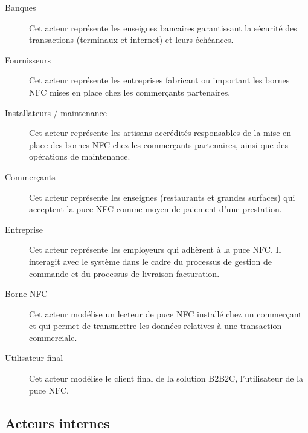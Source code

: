 \begin{description}
    \item[Banques] Cet acteur représente les enseignes bancaires garantissant
        la sécurité des transactions (terminaux et internet) et leurs
        échéances.
    \item[Fournisseurs] Cet acteur représente les entreprises fabricant ou
        important les bornes NFC mises en place chez les commerçants
        partenaires.
    \item[Installateurs / maintenance] Cet acteur représente les artisans
        accrédités responsables de la mise en place des bornes NFC chez les
        commerçants partenaires, ainsi que des opérations de maintenance.
    \item[Commerçants] Cet acteur représente les enseignes (restaurants et
        grandes surfaces) qui acceptent la puce NFC comme moyen de paiement
        d'une prestation.
    \item[Entreprise] Cet acteur représente les employeurs qui adhèrent à la
        puce NFC. Il interagit avec le système dans le cadre du processus de
        gestion de commande et du processus de livraison-facturation.
    \item[Borne NFC] Cet acteur modélise un lecteur de puce NFC installé chez
        un commerçant et qui permet de transmettre les données relatives à une
        transaction commerciale.
    \item[Utilisateur final] Cet acteur modélise le client final de la solution
        B2B2C, l'utilisateur de la puce NFC.
\end{description}

\subsection{Acteurs internes}

